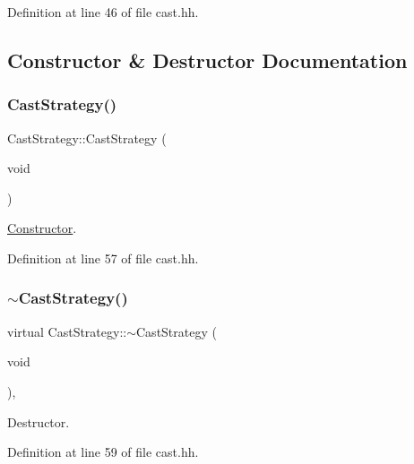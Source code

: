 Definition at line 46 of file cast.\+hh.



\subsection{Constructor \& Destructor Documentation}
\mbox{\label{class_cast_strategy_a40149d0e0a08e532c51a08fa297dbef0}} 
\subsubsection{\texorpdfstring{CastStrategy()}{CastStrategy()}}
{\footnotesize\ttfamily Cast\+Strategy\+::\+Cast\+Strategy (\begin{DoxyParamCaption}\item[{void}]{ }\end{DoxyParamCaption})\hspace{0.3cm}{\ttfamily [inline]}}



\mbox{\hyperlink{class_constructor}{Constructor}}. 



Definition at line 57 of file cast.\+hh.

\mbox{\label{class_cast_strategy_a0ecd3cc985eae0bc17658cad21f3c82e}} 
\subsubsection{\texorpdfstring{$\sim$CastStrategy()}{~CastStrategy()}}
{\footnotesize\ttfamily virtual Cast\+Strategy\+::$\sim$\+Cast\+Strategy (\begin{DoxyParamCaption}\item[{void}]{ }\end{DoxyParamCaption})\hspace{0.3cm}{\ttfamily [inline]}, {\ttfamily [virtual]}}



Destructor. 



Definition at line 59 of file cast.\+hh.




